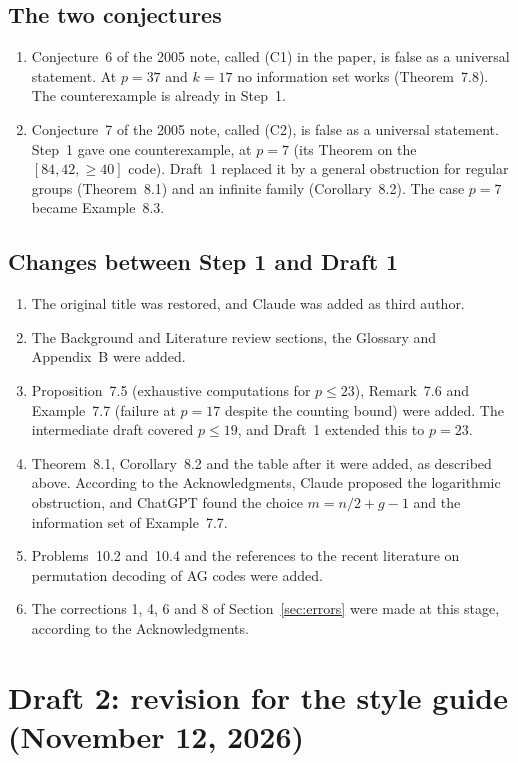 \documentclass[12pt,letterpaper]{article}
\begin{document}
\subsection{The two conjectures}
\begin{enumerate}
\item Conjecture~6 of the 2005 note, called (C1) in the paper, is false as a
universal statement. At $p=37$ and $k=17$ no information set works
(Theorem~7.8). The counterexample is already in Step~1.
\item Conjecture~7 of the 2005 note, called (C2), is false as a universal
statement. Step~1 gave one counterexample, at $p=7$ (its Theorem on the
$[84,42,\ge40]$ code). Draft~1 replaced it by a general obstruction for regular
groups (Theorem~8.1) and an infinite family (Corollary~8.2). The case $p=7$
became Example~8.3.
\end{enumerate}

\subsection{Changes between Step 1 and Draft 1}
\begin{enumerate}
\item The original title was restored, and Claude was added as third author.
\item The Background and Literature review sections, the Glossary and
Appendix~B were added.
\item Proposition~7.5 (exhaustive computations for $p\le23$), Remark~7.6 and
Example~7.7 (failure at $p=17$ despite the counting bound) were added. The
intermediate draft covered $p\le19$, and Draft~1 extended this to $p=23$.
\item Theorem~8.1, Corollary~8.2 and the table after it were added, as described
above. According to the Acknowledgments, Claude proposed the logarithmic
obstruction, and ChatGPT found the choice $m=n/2+g-1$ and the information set of
Example~7.7.
\item Problems~10.2 and~10.4 and the references to the recent literature on
permutation decoding of AG codes were added.
\item The corrections 1, 4, 6 and 8 of Section~\ref{sec:errors} were made at this
stage, according to the Acknowledgments.
\end{enumerate}

\section{Draft 2: revision for the style guide (November 12, 2026)}
\label{sec:draft2}
\end{document}
